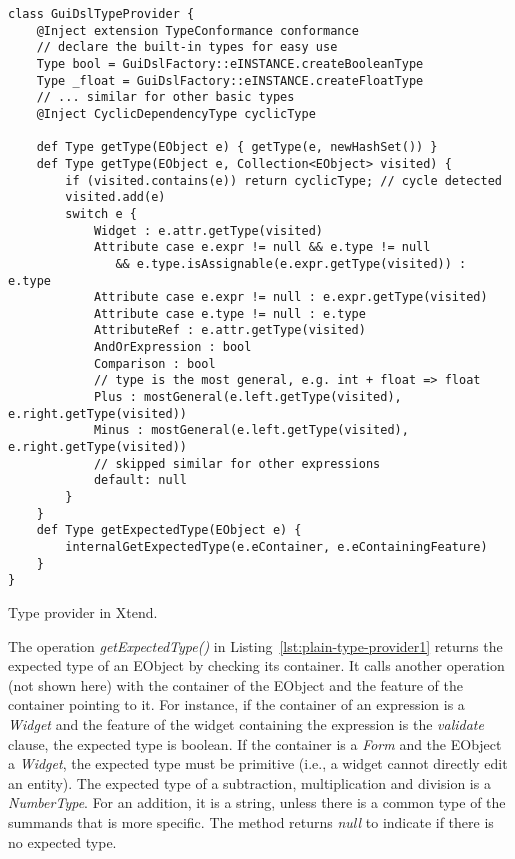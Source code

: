 \begin{listing}[tb]
\begin{lstlisting}[language=xtend] 
class GuiDslTypeProvider {
	@Inject extension TypeConformance conformance
	// declare the built-in types for easy use
	Type bool = GuiDslFactory::eINSTANCE.createBooleanType
	Type _float = GuiDslFactory::eINSTANCE.createFloatType
	// ... similar for other basic types
	@Inject CyclicDependencyType cyclicType

	def Type getType(EObject e) { getType(e, newHashSet()) }
	def Type getType(EObject e, Collection<EObject> visited) {
		if (visited.contains(e)) return cyclicType; // cycle detected
		visited.add(e)
		switch e {
			Widget : e.attr.getType(visited)
			Attribute case e.expr != null && e.type != null 
			   && e.type.isAssignable(e.expr.getType(visited)) : e.type
			Attribute case e.expr != null : e.expr.getType(visited)
			Attribute case e.type != null : e.type
			AttributeRef : e.attr.getType(visited)
			AndOrExpression : bool 
			Comparison : bool
			// type is the most general, e.g. int + float => float
			Plus : mostGeneral(e.left.getType(visited), e.right.getType(visited))
			Minus : mostGeneral(e.left.getType(visited), e.right.getType(visited))
			// skipped similar for other expressions
			default: null
		}
	} 
	def Type getExpectedType(EObject e) {
		internalGetExpectedType(e.eContainer, e.eContainingFeature) 
	} 
}
\end{lstlisting}
\label{lst:plain-type-provider1}
\caption{Type provider in Xtend.}
\end{listing}

The operation \emph{getExpectedType()} in Listing~\ref{lst:plain-type-provider1}
returns the expected type of an EObject by checking its container. It calls
another operation (not shown here) with the container of the EObject and the
feature of the container pointing to it. For instance, if the container of an
expression is a \emph{Widget} and the feature of the widget containing the
expression is the \emph{validate} clause, the expected type is boolean. If the
container is a \emph{Form} and the EObject a \emph{Widget}, the expected type
must be primitive (i.e., a widget cannot directly edit an entity).
The expected type of a subtraction, multiplication and division is a
\emph{NumberType}. For an addition, it is a string, unless there is a common
type of the summands that is more specific. The method returns \emph{null} to
indicate if there is no expected type.

